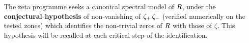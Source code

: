 The zeta programme seeks a canonical spectral model of $R$, under the
\textbf{conjectural hypothesis} of non-vanishing of
$\zeta_{+}\,\zeta_{-}$ (verified numerically on the tested zones) which
identifies the non-trivial zeros of $R$ with those of $\zeta$. This
hypothesis will be recalled at each critical step of the identification.

